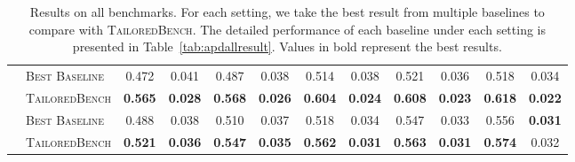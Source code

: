 \begin{table*}[ht]
\begin{tabular}{cl*{5}{cc}}
\hdashline
\multirow{2}{*}{Winogrande}&\textsc{Best Baseline} & 0.472 & 0.041 & 0.487 & 0.038 & 0.514 & 0.038 & 0.521 & 0.036 & 0.518 & 0.034 \\
                           & \textsc{TailoredBench} & \textbf{0.565} & \textbf{0.028} & \textbf{0.568} & \textbf{0.026} & \textbf{0.604} & \textbf{0.024} & \textbf{0.608} & \textbf{0.023} & \textbf{0.618} & \textbf{0.022} \\
\hdashline
\multirow{2}{*}{POPE}&\textsc{Best Baseline} & 0.488 & 0.038 & 0.510 & 0.037 & 0.518 & 0.034 & 0.547 & 0.033 & 0.556 & \textbf{0.031} \\
                           &\textsc{TailoredBench} & \textbf{0.521} & \textbf{0.036} & \textbf{0.547} & \textbf{0.035} & \textbf{0.562} & \textbf{0.031} & \textbf{0.563} & \textbf{0.031} & \textbf{0.574} & 0.032 \\
\bottomrule
\end{tabular}
\caption{Results on all benchmarks. For each setting, we take the best result from multiple baselines to compare with \textsc{TailoredBench}. The detailed performance of each baseline under each setting is presented in Table~\ref{tab:apdallresult}. Values in bold represent the best results.}
\label{tab:allresult}
\vspace{-0.4cm}
\end{table*}




